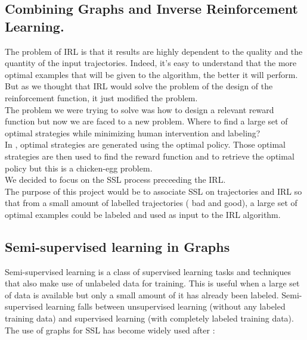 \documentclass{article}
\begin{document}
\subsection{Combining Graphs and Inverse Reinforcement Learning.}
The problem of IRL is that it results are highly dependent to the quality and the quantity of the input trajectories. Indeed, it's easy to understand that the more optimal examples that will be given to the algorithm, the better it will perform. \\
But as we thought that IRL would solve the problem of the design of the reinforcement function, it just modified the problem. \\
The problem we were trying to solve was how to design a relevant reward function but now we are faced to a new problem. 
Where to find a large set of optimal strategies while minimizing human intervention and labeling?\\
In \cite{Ng00}, optimal strategies are generated using the optimal policy. Those optimal strategies are then used to find the reward function and to retrieve the optimal policy but this is a chicken-egg problem.
\\
We decided to focus on the SSL process preceeding the IRL.\\
The purpose of this project would be to associate SSL on trajectories and IRL so that from a small amount of labelled trajectories ( bad and good), a large set of optimal examples could be labeled and used as input to the IRL algorithm.

\subsection{Semi-supervised learning in Graphs }


Semi-supervised learning is a class of supervised learning tasks and techniques that also make use of unlabeled data for training. This is useful when a large set of data is available but only a small amount of it has already been labeled. Semi-supervised learning falls between unsupervised learning (without any labeled training data) and supervised learning (with completely labeled training data).\\
The use of graphs for SSL has become widely used after : \\
\\
\end{document}
